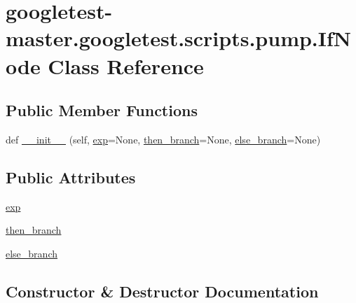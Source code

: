 \hypertarget{classgoogletest-master_1_1googletest_1_1scripts_1_1pump_1_1_if_node}{}\section{googletest-\/master.googletest.\+scripts.\+pump.\+If\+Node Class Reference}
\label{classgoogletest-master_1_1googletest_1_1scripts_1_1pump_1_1_if_node}
\subsection*{Public Member Functions}
\begin{DoxyCompactItemize}
\item 
def \mbox{\hyperlink{classgoogletest-master_1_1googletest_1_1scripts_1_1pump_1_1_if_node_a8c57c6ac0175f6d267e8f6f610c2bdb4}{\+\_\+\+\_\+init\+\_\+\+\_\+}} (self, \mbox{\hyperlink{classgoogletest-master_1_1googletest_1_1scripts_1_1pump_1_1_if_node_a3481d4e4982f2d1610c050ff44901d1c}{exp}}=None, \mbox{\hyperlink{classgoogletest-master_1_1googletest_1_1scripts_1_1pump_1_1_if_node_a7e69184ee75910795712a3ea61456463}{then\+\_\+branch}}=None, \mbox{\hyperlink{classgoogletest-master_1_1googletest_1_1scripts_1_1pump_1_1_if_node_af7b63854a9fe78a8cf8e36336f1e2c40}{else\+\_\+branch}}=None)
\end{DoxyCompactItemize}
\subsection*{Public Attributes}
\begin{DoxyCompactItemize}
\item 
\mbox{\hyperlink{classgoogletest-master_1_1googletest_1_1scripts_1_1pump_1_1_if_node_a3481d4e4982f2d1610c050ff44901d1c}{exp}}
\item 
\mbox{\hyperlink{classgoogletest-master_1_1googletest_1_1scripts_1_1pump_1_1_if_node_a7e69184ee75910795712a3ea61456463}{then\+\_\+branch}}
\item 
\mbox{\hyperlink{classgoogletest-master_1_1googletest_1_1scripts_1_1pump_1_1_if_node_af7b63854a9fe78a8cf8e36336f1e2c40}{else\+\_\+branch}}
\end{DoxyCompactItemize}


\subsection{Constructor \& Destructor Documentation}
\mbox{\label{classgoogletest-master_1_1googletest_1_1scripts_1_1pump_1_1_if_node_a8c57c6ac0175f6d267e8f6f610c2bdb4}} 
